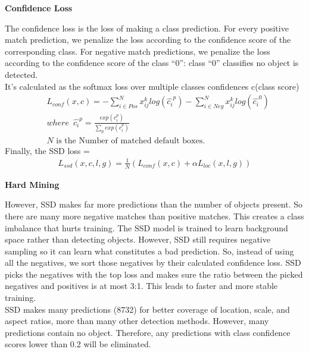 \documentclass[12pt]{article}
\begin{document}
\begin{flushleft}
\textbf{Confidence Loss}
\end{flushleft}
The confidence loss is the loss of making a class prediction. For every positive match prediction, we penalize the loss according to the confidence score of the corresponding class. For negative match predictions, we penalize the loss according to the confidence score of the class “0”: class “0” classifies no object is detected.\\
It's calculated as the softmax loss over multiple classes confidences c(class score)\\
\begin{align*}
    & L_{conf}(x,c)=-\sum_{i\in Pos}^{N} x_{ij}^{k}log(\hat{c_{i}}^{p})-\sum_{i\in Neg}^{N} x_{ij}^{k}log(\hat{c_{i}}^{0})\\
    & where \enspace \hat{c_{i}}^{p}=\frac{exp(c_{i}^{p})}{\sum_{p}exp(c_{i}^{p})} \\
    & N \text{ is the Number of matched default boxes.}
\end{align*}
Finally, the SSD loss =
\begin{align*}
    L_{ssd}(x,c,l,g)=\frac{1}{N}(L_{conf}(x,c)+\alpha L_{loc}(x,l,g))
\end{align*}

\begin{flushleft}
\textbf{Hard Mining}
\end{flushleft}
However, SSD makes far more predictions than the number of objects present. So there are many more negative matches than positive matches. This creates a class imbalance that hurts training. The SSD model is trained to learn background space rather than detecting objects. However, SSD still requires negative sampling so it can learn what constitutes a bad prediction. So, instead of using all the negatives, we sort those negatives by their calculated confidence loss. SSD picks the negatives with the top loss and makes sure the ratio between the picked negatives and positives is at most 3:1. This leads to faster and more stable training.\\

SSD makes many predictions (8732) for better coverage of location, scale, and aspect ratios, more than many other detection methods. However, many predictions contain no object. Therefore, any predictions with class confidence scores lower than 0.2 will be eliminated.\\
\end{document}
